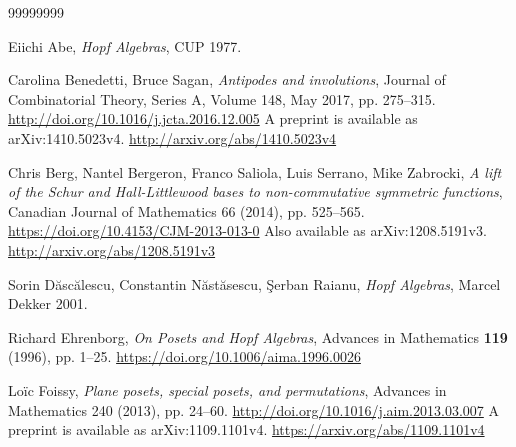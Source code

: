 \documentclass[numbers=enddot,12pt,final,onecolumn,notitlepage,abstracton]{scrartcl}
\theoremstyle{definition}
\begin{document}
\begin{thebibliography}{99999999}                                                                                         %

Eiichi Abe, \textit{Hopf Algebras}, CUP 1977.


Carolina Benedetti, Bruce Sagan,
\textit{Antipodes and involutions},
Journal of Combinatorial Theory, Series A,
Volume 148, May 2017, pp. 275--315.
\newline\url{http://doi.org/10.1016/j.jcta.2016.12.005}
\newline A preprint is available as arXiv:1410.5023v4.\newline
\url{http://arxiv.org/abs/1410.5023v4}

Chris Berg, Nantel Bergeron, Franco Saliola, Luis
Serrano, Mike Zabrocki, \textit{A lift of the Schur and Hall-Littlewood bases
to non-commutative symmetric functions}, Canadian Journal of Mathematics 66
(2014), pp. 525--565.\newline
\url{https://doi.org/10.4153/CJM-2013-013-0}
\newline Also available as arXiv:1208.5191v3.\newline
\url{http://arxiv.org/abs/1208.5191v3}

Sorin D\u{a}sc\u{a}lescu, Constantin
N\u{a}st\u{a}sescu, \c{S}erban Raianu, \textit{Hopf Algebras}, Marcel Dekker 2001.

Richard Ehrenborg,
\textit{On Posets and Hopf Algebras},
Advances in Mathematics \textbf{119} (1996), pp. 1--25.
\newline\url{https://doi.org/10.1006/aima.1996.0026}

Lo\"ic Foissy,
\textit{Plane posets, special posets, and permutations},
Advances in Mathematics 240 (2013), pp. 24--60.
\newline\url{http://doi.org/10.1016/j.aim.2013.03.007}
\newline A preprint is available as arXiv:1109.1101v4.\newline
\url{https://arxiv.org/abs/1109.1101v4}


\end{thebibliography}
\end{document}
